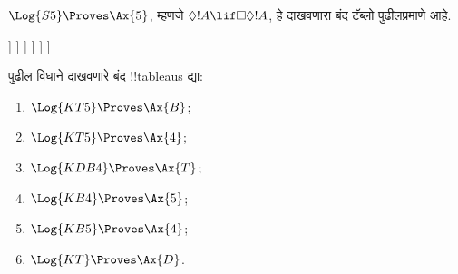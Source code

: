 \documentclass[../../../include/open-logic-section]{subfiles}
\begin{document}
\begin{ex}
  $\Log{S5} \Proves \Ax{5}$, म्हणजे
  $\Diamond!A \lif \Box\Diamond!A$, हे दाखवणारा
  बंद टॅब्लो पुढीलप्रमाणे आहे.
  \begin{oltableau}
    [\pFmla{\False}{\Diamond\formula{A} \lif \Box\Diamond \formula{A}}{1},
      just = \TAss
      [\pFmla{\True}{\Diamond \formula{A}}{1}, just = {\TRule{\False}{\lif}[1]}
        [\pFmla{\False}{\Box\Diamond \formula{A}}{1},
          just = {\TRule{\False}{\lif}[1]}
          [\pFmla{\False}{\Diamond \formula{A}}{1.1},
            just = {\TRule{\False}{\Box}[3]}
            [\pFmla{\False}{\Diamond \formula{A}}{1},
              just = {4r$\Diamond$ 4}
              [\pFmla{\True}{\formula{A}}{1.2},
                just = {\TRule{\True}{\Diamond}[2]}
                [\pFmla{\False}{\formula{A}}{1.2},
                  just = {\TRule{\False}{\Diamond}[5]}, close]
              ]
            ]
          ]
        ]
      ]
    ]
  \end{oltableau}
\end{ex}

\begin{prob}
पुढील विधाने दाखवणारे बंद !!{tableau}s द्या:
  \begin{enumerate}
  \item $\Log{KT5} \Proves \Ax{B}$;
  \item $\Log{KT5} \Proves \Ax{4}$;
  \item $\Log{KDB4} \Proves \Ax{T}$;
  \item $\Log{KB4} \Proves \Ax{5}$;
  \item $\Log{KB5} \Proves \Ax{4}$;
  \item $\Log{KT} \Proves \Ax{D}$.
  \end{enumerate}
\end{prob}
\end{document}
